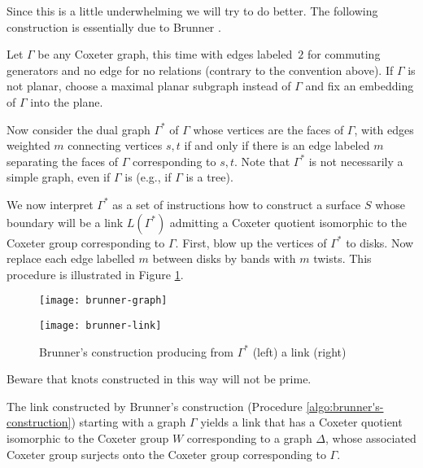 \documentclass[main.tex]{subfiles}
\begin{document}
Since this is a little underwhelming we will try to do better. The following construction is essentially due to Brunner \cite{brunner1992}.

\begin{algo}\label{algo:brunner's-construction}
Let $\Gamma$ be any Coxeter graph, this time with edges labeled~$2$ for commuting generators and no edge for no relations (contrary to the convention above). If $\Gamma$ is not planar, choose a maximal planar subgraph instead of $\Gamma$ and fix an embedding of $\Gamma$ into the plane.

Now consider the dual graph $\Gamma^*$ of $\Gamma$ whose vertices are the faces of $\Gamma$, with edges weighted $m$ connecting vertices $s, t$ if and only if there is an edge labeled $m$ separating the faces of $\Gamma$ corresponding to $s, t$. Note that $\Gamma^*$ is not necessarily a simple graph, even if $\Gamma$ is (e.g., if $\Gamma$ is a tree).

We now interpret $\Gamma^*$ as a set of instructions how to construct a surface $S$ whose boundary will be a link $L(\Gamma^*)$ admitting a Coxeter quotient isomorphic to the Coxeter group corresponding to $\Gamma$. First, blow up the vertices of $\Gamma^*$ to disks. Now replace each edge labelled $m$ between disks by bands with $m$ twists. This procedure is illustrated in Figure \ref{fig:brunners-construction}.
\end{algo}

\begin{figure}[htb]
\centering
\begin{minipage}{0.37\textwidth}
\centering
\texttt{[image: brunner-graph]}
\end{minipage}%
\begin{minipage}{0.63\textwidth}
\centering
\texttt{[image: brunner-link]}
\end{minipage}
\caption{Brunner's construction producing from $\Gamma^*$ (left) a link (right)}
\label{fig:brunners-construction}
\end{figure}

Beware that knots constructed in this way will not be prime.

\begin{theorem}\label{thm:correctness-of-brunner}
The link constructed by Brunner's construction \textup{(Procedure \ref{algo:brunner's-construction})} starting with a graph $\Gamma$ yields a link that has a Coxeter quotient isomorphic to the Coxeter group $W$ corresponding to a graph $\Delta$, whose associated Coxeter group surjects onto the Coxeter group corresponding to $\Gamma$.
\end{theorem}
\end{document}
